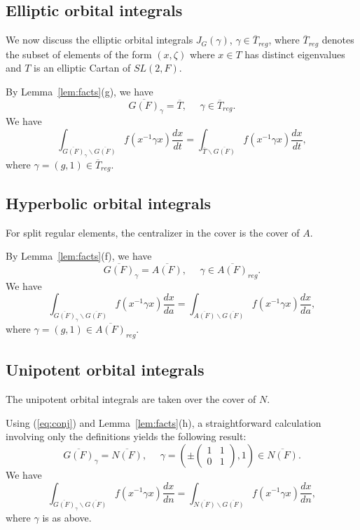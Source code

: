 \documentclass[12pt,letterpaper]{book}
\theoremstyle{plain}
\theoremstyle{definition}
\theoremstyle{remark}
\theoremstyle{remark}
\begin{document}
\subsection{Elliptic orbital integrals}

We now discuss the elliptic orbital integrals $J_G(\gamma)$,
$\gamma\in \overline{T}_{reg}$, where $\overline{T}_{reg}$
denotes the subset of elements of the form $(x,\zeta)$
where $x\in T$ has distinct eigenvalues and $T$ is an elliptic
Cartan of $SL(2,F)$.

By Lemma~\ref{lem:facts}(g), we have
\[
\overline{G(F)}_\gamma
=\overline{T},\ \ \ \ \ \
\gamma\in \overline{T}_{reg}.
\]
We have
\begin{equation}
\int_{\overline{G(F)}_\gamma\backslash \overline{G(F)}}
f(x^{-1}\gamma x)\frac{dx}{dt}
=\int_{\overline{T}\backslash \overline{G(F)}}
f(x^{-1}\gamma x)\frac{dx}{dt},
\end{equation}
where $\gamma =(g,1)\in \overline{T}_{reg}$.

\subsection{Hyperbolic orbital integrals}

For split regular elements, the centralizer in the cover is the cover of $A$.


By Lemma~\ref{lem:facts}(f), we have
\[
\overline{G(F)}_\gamma
=\overline{A(F)},\ \ \ \ \ \
\gamma\in \overline{A(F)}_{reg}.
\]
We have
\begin{equation}
\int_{\overline{G(F)}_\gamma\backslash \overline{G(F)}}
f(x^{-1}\gamma x)\frac{dx}{da}
=\int_{\overline{A(F)}\backslash \overline{G(F)}}
f(x^{-1}\gamma x)\frac{dx}{da},
\end{equation}
where $\gamma =(g,1)\in \overline{A(F)}_{reg}$.

\subsection{Unipotent orbital integrals}

The unipotent orbital integrals are taken over the cover of $N$.


Using (\ref{eq:conj}) and Lemma~\ref{lem:facts}(h), a straightforward calculation involving only the definitions
yields the following result:
\[
\overline{G(F)}_\gamma
=\overline{N(F)},\ \ \ \ \ \
\gamma=
(
\pm \left(
\begin{array}{cc}
1 & 1\\
0 & 1
\end{array}
\right)
,1)\in \overline{N(F)}.
\]
We have
\begin{equation}
\int_{\overline{G(F)}_\gamma\backslash \overline{G(F)}}
f(x^{-1}\gamma x)\frac{dx}{dn}
=\int_{\overline{N(F)}\backslash \overline{G(F)}}
f(x^{-1}\gamma x)\frac{dx}{dn},
\end{equation}
where $\gamma $ is as above.
\end{document}
